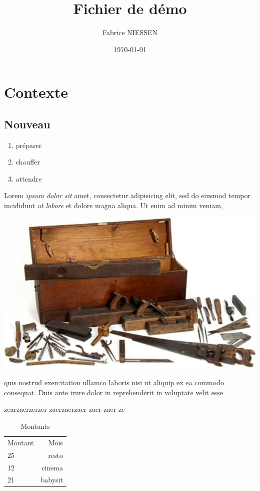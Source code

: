 \documentclass[final,anonym]{mcarticle}
\author{Fabrice NIESSEN}
\date{\today}
\title{Fichier de démo}
\begin{document}
\maketitle

\chapter{Contexte}
\label{sec:org7b7d438}

\section{Nouveau}
\label{sec:nouveau}


\begin{enumerate}
\item préparer
\item chauffer
\item attendre
\end{enumerate}

Lorem \textsl{ipsum dolor sit} amet, consectetur adipisicing elit, sed do eiusmod
tempor incididunt \textsl{ut labore} et dolore magna aliqua. Ut enim ad minim veniam,

\begin{center}
\includegraphics[width=.75\linewidth]{images/toolbox-messy.png}
\end{center}

\label{sec:org1e0b4ed}

quis nostrud exercitation ullamco laboris nisi ut aliquip ex ea commodo
consequat. Duis aute irure dolor in reprehenderit in voluptate velit esse

zearzaerzerzer
zaerzaerzaer
zaer
zaer
ze

\begin{table}[!htbp]
  \caption{\label{tab:org84e6251} Montants}
  \centering
  \begin{tabular}{lr}
      Montant & Mois      \\
      25      & resto     \\
      12      & cinema    \\
      21      & babysit   \\
  \end{tabular}
\end{table}
\end{document}
